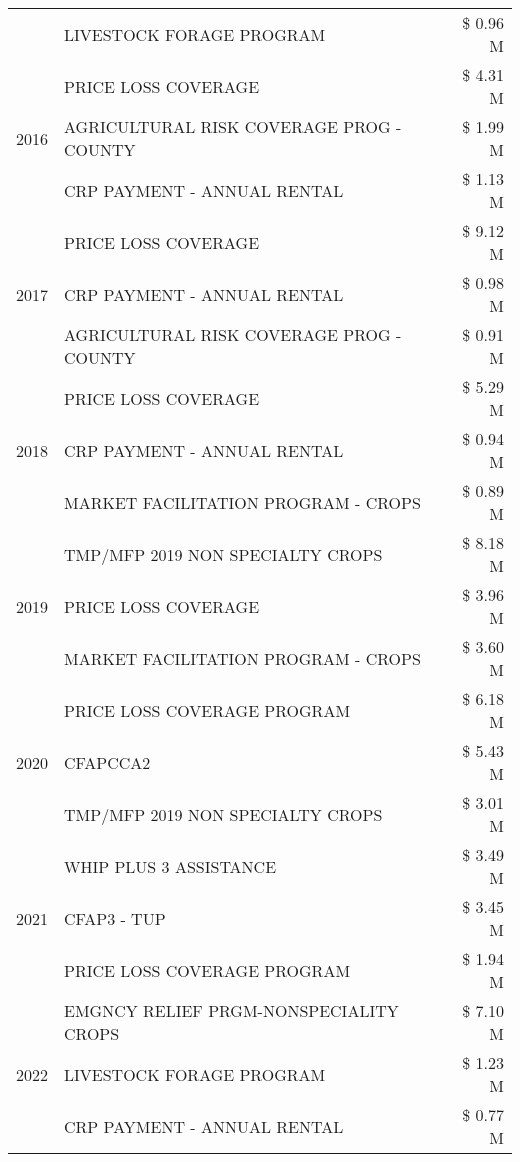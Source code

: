 \begin{tabular}{llr}
 & LIVESTOCK FORAGE PROGRAM & \$ 0.96 M \\
\cline{1-3}
\multirow[t]{3}{*}{2016} & PRICE LOSS COVERAGE & \$ 4.31 M \\
 & AGRICULTURAL RISK COVERAGE PROG - COUNTY & \$ 1.99 M \\
 & CRP PAYMENT - ANNUAL RENTAL & \$ 1.13 M \\
\cline{1-3}
\multirow[t]{3}{*}{2017} & PRICE LOSS COVERAGE & \$ 9.12 M \\
 & CRP PAYMENT - ANNUAL RENTAL & \$ 0.98 M \\
 & AGRICULTURAL RISK COVERAGE PROG - COUNTY & \$ 0.91 M \\
\cline{1-3}
\multirow[t]{3}{*}{2018} & PRICE LOSS COVERAGE & \$ 5.29 M \\
 & CRP PAYMENT - ANNUAL RENTAL & \$ 0.94 M \\
 & MARKET FACILITATION PROGRAM - CROPS & \$ 0.89 M \\
\cline{1-3}
\multirow[t]{3}{*}{2019} & TMP/MFP 2019 NON SPECIALTY CROPS & \$ 8.18 M \\
 & PRICE LOSS COVERAGE & \$ 3.96 M \\
 & MARKET FACILITATION PROGRAM - CROPS & \$ 3.60 M \\
\cline{1-3}
\multirow[t]{3}{*}{2020} & PRICE LOSS COVERAGE PROGRAM & \$ 6.18 M \\
 & CFAPCCA2 & \$ 5.43 M \\
 & TMP/MFP 2019 NON SPECIALTY CROPS & \$ 3.01 M \\
\cline{1-3}
\multirow[t]{3}{*}{2021} & WHIP PLUS 3 ASSISTANCE & \$ 3.49 M \\
 & CFAP3 - TUP & \$ 3.45 M \\
 & PRICE LOSS COVERAGE PROGRAM & \$ 1.94 M \\
\cline{1-3}
\multirow[t]{3}{*}{2022} & EMGNCY RELIEF PRGM-NONSPECIALITY CROPS & \$ 7.10 M \\
 & LIVESTOCK FORAGE PROGRAM & \$ 1.23 M \\
 & CRP PAYMENT - ANNUAL RENTAL & \$ 0.77 M \\
\cline{1-3}
\bottomrule
\end{tabular}
